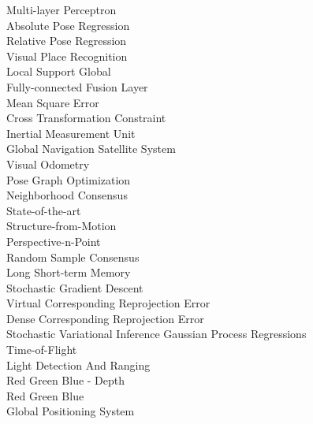 \begin{arc}
			{Multi-layer Perceptron } 		\\
			{Absolute Pose Regression} 		\\
			{Relative Pose Regression} 		\\
			{Visual Place Recognition} \\
			{Local Support Global} \\
			{Fully-connected Fusion Layer} \\
			{Mean Square Error} \\
			{Cross Transformation Constraint} \\
			{Inertial Measurement Unit} \\
			{Global Navigation Satellite System} \\
			{Visual Odometry} \\
			{Pose Graph Optimization} \\
			{Neighborhood Consensus} \\
			{State-of-the-art} \\
			{Structure-from-Motion} \\
			{Perspective-n-Point} \\
		{Random Sample Consensus} \\
			{Long Short-term Memory} \\
			{Stochastic Gradient Descent} \\
			{Virtual Corresponding Reprojection Error} \\
			{Dense Corresponding Reprojection Error} \\
	 	{Stochastic Variational Inference Gaussian Process Regressions} \\
			{Time-of-Flight} 						\\
			{Light Detection And Ranging} \\
			{Red Green Blue - Depth} \\
			{Red Green Blue} \\
			{Global Positioning System} \\
\end{arc}


